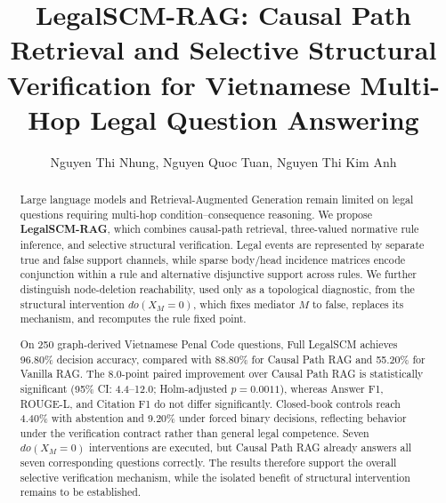 \documentclass[runningheads]{llncs}
\begin{document}
\title{LegalSCM-RAG: Causal Path Retrieval and Selective Structural Verification for Vietnamese Multi-Hop Legal Question Answering}

\author{Nguyen Thi Nhung, Nguyen Quoc Tuan, Nguyen Thi Kim Anh}


\maketitle
\pagestyle{empty}

\begin{abstract}
Large language models and Retrieval-Augmented Generation remain limited on
legal questions requiring multi-hop condition--consequence reasoning. We
propose \textbf{LegalSCM-RAG}, which combines causal-path retrieval,
three-valued normative rule inference, and selective structural verification.
Legal events are represented by separate true and false support channels, while
sparse body/head incidence matrices encode conjunction within a rule and
alternative disjunctive support across rules. We further distinguish
node-deletion reachability, used only as a topological diagnostic, from the
structural intervention $do(X_M=0)$, which fixes mediator $M$ to false, replaces
its mechanism, and recomputes the rule fixed point.

On 250 graph-derived Vietnamese Penal Code questions, Full LegalSCM achieves
96.80\% decision accuracy, compared with 88.80\% for Causal Path RAG and
55.20\% for Vanilla RAG. The 8.0-point paired improvement over Causal Path RAG
is statistically significant (95\% CI: 4.4--12.0; Holm-adjusted
$p=0.0011$), whereas Answer F1, ROUGE-L, and Citation F1 do not differ
significantly. Closed-book controls reach 4.40\% with abstention and 9.20\%
under forced binary decisions, reflecting behavior under the verification
contract rather than general legal competence. Seven $do(X_M=0)$ interventions
are executed, but Causal Path RAG already answers all seven corresponding
questions correctly. The results therefore support the overall selective
verification mechanism, while the isolated benefit of structural intervention
remains to be established.

\end{abstract}












\end{document}
